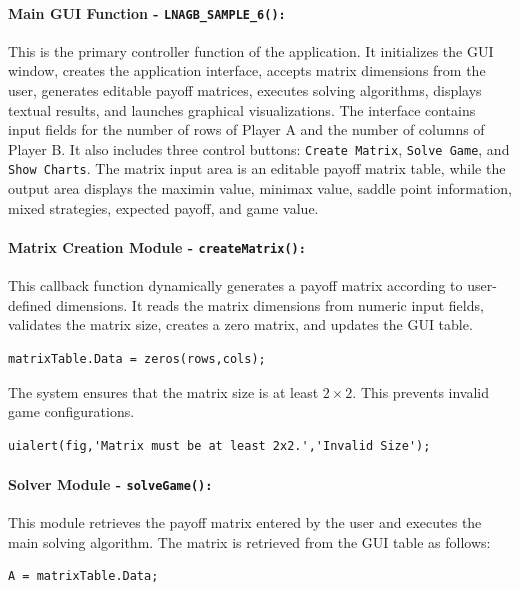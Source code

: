 \documentclass[12pt,a4paper]{article}
\begin{document}
\paragraph{Main GUI Function - \texttt{LNAGB\_SAMPLE\_6():}}

This is the primary controller function of the application. It initializes the GUI window, creates the application interface, accepts matrix dimensions from the user, generates editable payoff matrices, executes solving algorithms, displays textual results, and launches graphical visualizations. The interface contains input fields for the number of rows of Player A and the number of columns of Player B. It also includes three control buttons: \texttt{Create Matrix}, \texttt{Solve Game}, and \texttt{Show Charts}. The matrix input area is an editable payoff matrix table, while the output area displays the maximin value, minimax value, saddle point information, mixed strategies, expected payoff, and game value.

\paragraph{Matrix Creation Module - \texttt{createMatrix():}}

This callback function dynamically generates a payoff matrix according to user-defined dimensions. It reads the matrix dimensions from numeric input fields, validates the matrix size, creates a zero matrix, and updates the GUI table.

\begin{lstlisting}[style=code]
matrixTable.Data = zeros(rows,cols);
\end{lstlisting}

The system ensures that the matrix size is at least \(2 \times 2\). This prevents invalid game configurations.

\begin{lstlisting}[style=code]
uialert(fig,'Matrix must be at least 2x2.','Invalid Size');
\end{lstlisting}

\paragraph{Solver Module - \texttt{solveGame():}}

This module retrieves the payoff matrix entered by the user and executes the main solving algorithm. The matrix is retrieved from the GUI table as follows:

\begin{lstlisting}[style=code]
A = matrixTable.Data;
\end{lstlisting}
\end{document}
